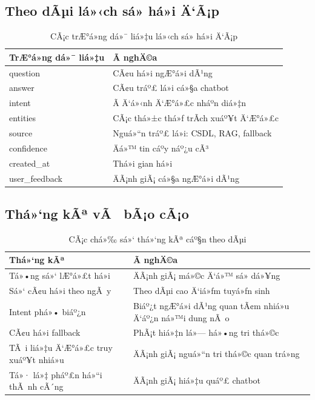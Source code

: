 ﻿\documentclass[12pt,a4paper]{report}
\begin{document}
\subsection{Theo dÃµi lá»‹ch sá»­ há»i Ä‘Ã¡p}
\begin{table}[H]
\centering
\caption{CÃ¡c trÆ°á»ng dá»¯ liá»‡u lá»‹ch sá»­ há»i Ä‘Ã¡p}
\label{tab:qa_history_fields}
\begin{tabular}{|p{3.6cm}|p{8.4cm}|}
\hline
\textbf{TrÆ°á»ng dá»¯ liá»‡u} & \textbf{Ã nghÄ©a} \\ \hline
question & CÃ¢u há»i ngÆ°á»i dÃ¹ng \\ \hline
answer & CÃ¢u tráº£ lá»i cá»§a chatbot \\ \hline
intent & Ã Ä‘á»‹nh Ä‘Æ°á»£c nháº­n diá»‡n \\ \hline
entities & CÃ¡c thá»±c thá»ƒ trÃ­ch xuáº¥t Ä‘Æ°á»£c \\ \hline
source & Nguá»“n tráº£ lá»i: CSDL, RAG, fallback \\ \hline
confidence & Äá»™ tin cáº­y náº¿u cÃ³ \\ \hline
created\_at & Thá»i gian há»i \\ \hline
user\_feedback & ÄÃ¡nh giÃ¡ cá»§a ngÆ°á»i dÃ¹ng \\ \hline
\end{tabular}
\end{table}

\subsection{Thá»‘ng kÃª vÃ  bÃ¡o cÃ¡o}
\begin{table}[H]
\centering
\caption{CÃ¡c chá»‰ sá»‘ thá»‘ng kÃª cáº§n theo dÃµi}
\label{tab:admin_statistics}
\begin{tabular}{|p{4cm}|p{8cm}|}
\hline
\textbf{Thá»‘ng kÃª} & \textbf{Ã nghÄ©a} \\ \hline
Tá»•ng sá»‘ lÆ°á»£t há»i & ÄÃ¡nh giÃ¡ má»©c Ä‘á»™ sá»­ dá»¥ng \\ \hline
Sá»‘ cÃ¢u há»i theo ngÃ y & Theo dÃµi cao Ä‘iá»ƒm tuyá»ƒn sinh \\ \hline
Intent phá»• biáº¿n & Biáº¿t ngÆ°á»i dÃ¹ng quan tÃ¢m nhiá»u Ä‘áº¿n ná»™i dung nÃ o \\ \hline
CÃ¢u há»i fallback & PhÃ¡t hiá»‡n lá»— há»•ng tri thá»©c \\ \hline
TÃ i liá»‡u Ä‘Æ°á»£c truy xuáº¥t nhiá»u & ÄÃ¡nh giÃ¡ nguá»“n tri thá»©c quan trá»ng \\ \hline
Tá»· lá»‡ pháº£n há»“i thÃ nh cÃ´ng & ÄÃ¡nh giÃ¡ hiá»‡u quáº£ chatbot \\ \hline
\end{tabular}
\end{table}
\end{document}
